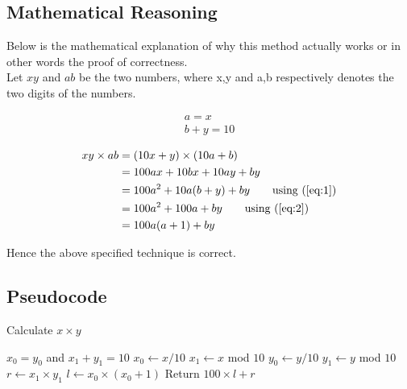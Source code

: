 \documentclass[]{article}
\begin{document}
\subsection{Mathematical Reasoning}
Below is the mathematical explanation of why this method actually works or in other words the proof of correctness.\\
Let $xy$ and $ab$ be the two numbers, where x,y and a,b respectively denotes the two digits of the numbers.

\begin{align}
a = x \label{eq:1}\\
b + y =10 \label{eq:2}
\end{align}

\begin{align*}
xy \times ab&=(10x+y) \times (10a+b) \\
&= 100ax + 10bx + 10ay + by\\
&= 100a^2 + 10a(b+y) + by \tag*{using (\ref{eq:1})}\\
&= 100a^2 + 100a + by \tag*{using (\ref{eq:2})}\\
&= 100a(a + 1) + by
\end{align*}

Hence the above specified technique is correct.

\subsection{Pseudocode}
\begin{algorithm}
\caption{Calculate $x \times y$}
\begin{algorithmic} 
\REQUIRE $x_0 = y_0$ and $x_1 + y_1 = 10$
\STATE $x_0 \leftarrow x/10$
\STATE $x_1 \leftarrow x$ mod $10$
\STATE $y_0 \leftarrow y/10$
\STATE $y_1 \leftarrow y$ mod $10$
\STATE $r \leftarrow x_1 \times y_1$
\STATE $l \leftarrow x_0 \times (x_0 + 1)$
\STATE Return $100 \times l + r$
\end{algorithmic}
\end{algorithm}
\end{document}
